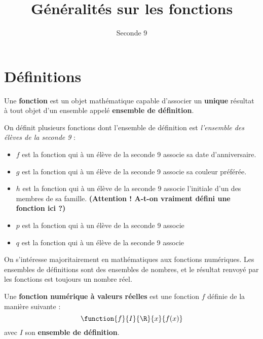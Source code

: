 \documentclass{article}
\title{Généralités sur les fonctions}
\author{Seconde 9}
\date{}
\begin{document}
\maketitle

\section{Définitions}
\begin{tcolorbox}
\begin{definition}
Une \textbf{fonction} est un objet mathématique capable d'associer un \textbf{unique} résultat à tout objet d'un ensemble appelé \textbf{ensemble de définition}. 
\end{definition}
\end{tcolorbox}
\begin{example}
On définit plusieurs fonctions dont l'ensemble de définition est \emph{l'ensemble des élèves de la seconde 9} :
\begin{itemize}
\item $f$ est la fonction qui à un élève de la seconde 9 associe sa date d'anniversaire.
\item $g$ est la fonction qui à un élève de la seconde 9 associe sa couleur préférée.
\item $h$ est la fonction qui à un élève de la seconde 9 associe l'initiale d'un des membres de sa famille. \textbf{(Attention ! A-t-on vraiment défini une fonction ici ?)}
\item $p$ est la fonction qui à un élève de la seconde 9 associe \answersline
\item $q$ est la fonction qui à un élève de la seconde 9 associe \answersline
\end{itemize}
\end{example}
\begin{remark}
On s'intéresse majoritairement en mathématiques aux fonctions numériques. Les ensembles de définitions sont des ensembles de nombres, et le résultat renvoyé par les fonctions est toujours un nombre réel.
\end{remark}
\begin{tcolorbox}
\begin{definition}
Une \textbf{fonction numérique à valeurs réelles} est une fonction $f$ définie de la manière suivante :
\begin{equation*}
\function{f}{I}{\R}{x}{f(x)}
\end{equation*}
avec $I$ son \textbf{ensemble de définition}.
\end{definition}
\end{tcolorbox}
\end{document}

